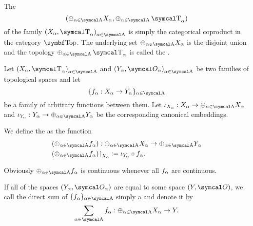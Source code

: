 \begin{definition}\label{def:topological_sum}\cite[74]{Engelking1989}
  The 
  \begin{equation*}
    (\oplus_{\al \in \CA} X_\al, \oplus_{\al \in \CA} \CT_\al)
  \end{equation*}
  of the family \( { (X_\al, \CT_\al) }_{\al \in \CA} \) is simply the categorical coproduct in the category \( \Cat{Top} \). The underlying set \( \oplus_{\al \in \CA} X_\al \) is the disjoint union and the topology \( \oplus_{\al \in \CA} \CT_\al \) is called the .

  Let \( { (X_\al, \CT_\al) }_{\al \in \CA} \) and \( { (Y_\al, \Cal{O}_\al) }_{\al \in \CA} \) be two families of topological spaces and let 
  \begin{equation*}
    \{ f_\al: X_\al \to Y_\al \}_{\al \in \CA}
  \end{equation*}
  be a family of arbitrary functions between them. Let \( \iota_{X_\al}: X_\al \to \oplus_{\al \in \CA} X_\al \) and \( \iota_{Y_\al}: Y_\al \to \oplus_{\al \in \CA} Y_\al \) be the corresponding canonical embeddings.

  We define the  as the function
  \begin{align*}
    &(\oplus_{\al \in \CA} f_\al): \oplus_{\al \in \CA} X_\al \to \oplus_{\al \in \CA} Y_\al \\
    &(\oplus_{\al \in \CA} f_\al){\restriction}_{X_\al} \coloneqq \iota_{Y_\al} \circ f_\al.
  \end{align*}

  Obviously \( \oplus_{\al \in \CA} f_\al \) is continuous whenever all \( f_\alpha \) are continuous.

  If all of the spaces \( (Y_\al, \Cal{O}_\al) \) are equal to some space \( (Y, \Cal{O}) \), we call the direct sum of \( \{ f_\al \}_{\al \in \CA} \) simply a  and denote it by
  \begin{equation*}
    \sum_{\al \in \CA} f_\al: \oplus_{\al \in \CA} X_\al \to Y.
  \end{equation*}
\end{definition}
